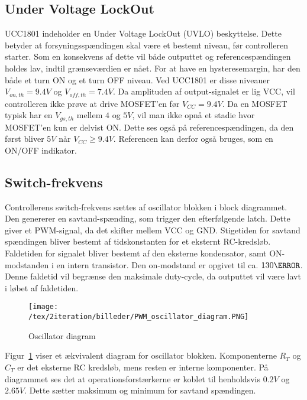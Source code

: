 \subsection{Under Voltage LockOut}
UCC1801 indeholder en Under Voltage LockOut (UVLO) beskyttelse. Dette betyder at forsyningsspændingen skal være et bestemt niveau, før controlleren starter. Som en konsekvens af dette vil både outputtet og referencespændingen holdes lav, indtil grænseværdien er nået. For at have en hysteresemargin, har den både et turn ON og et turn OFF niveau. Ved UCC1801 er disse niveauer $V_{on,th}=9.4V$ og $V_{off,th}=7.4V$. Da amplituden af output-signalet er lig VCC, vil controlleren ikke prøve at drive MOSFET'en før $V_{CC}=9.4V$. Da en MOSFET typisk har en $V_{gs,th}$ mellem $4$ og $5V$, vil man ikke opnå et stadie hvor MOSFET'en kun er delvist ON. Dette ses også på referencespændingen, da den først bliver $5V$ når $V_{CC}\geqslant 9.4V$. Referencen kan derfor også bruges, som en ON/OFF indikator. 

\subsection{Switch-frekvens}
Controllerens switch-frekvens sættes af oscillator blokken i block diagrammet. Den genererer en savtand-spænding, som trigger den efterfølgende latch. Dette giver et PWM-signal, da det skifter mellem VCC og GND.
Stigetiden for savtand spændingen bliver bestemt af tidskonstanten for et eksternt RC-kredsløb. Faldetiden for signalet bliver bestemt af den eksterne kondensator, samt ON-modstanden i en intern transistor. Den on-modstand er opgivet til ca. $130\ohm$. Denne faldetid vil begrænse den maksimale duty-cycle, da outputtet vil være lavt i løbet af faldetiden. 

\begin{figure}[H]
	\center
	\texttt{[image: /tex/2iteration/billeder/PWM\_oscillator\_diagram.PNG]}
	\caption{Oscillator diagram}
	\label{fig:PWM_oscillator_diagram}
\end{figure}

Figur~\ref{fig:PWM_oscillator_diagram} viser et ækvivalent diagram for oscillator blokken. Komponenterne $R_T$ og $C_T$ er det eksterne RC kredsløb, mens resten er interne komponenter. På diagrammet ses det at operationsforstærkerne er koblet til henholdsvis $0.2V$ og $2.65V$. Dette sætter maksimum og minimum for savtand spændingen. 

